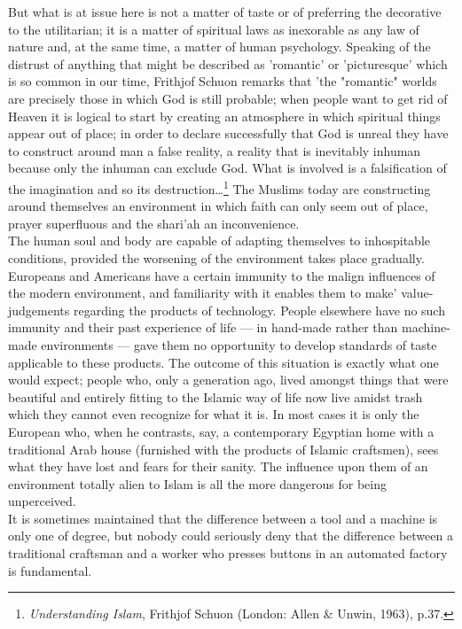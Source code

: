 \documentclass[11pt, b5paper, twoside]{book}
\begin{document}
But what is at issue here is not a matter of taste or of preferring the decorative to the 
utilitarian; it is a matter of spiritual laws as inexorable as any law of nature and, at the same 
time, a matter of human psychology. Speaking of the distrust of anything that might be described as 
'romantic' or 'picturesque' which is so common in our time, Frithjof Schuon remarks that 'the 
"romantic" worlds are precisely those in which God is still probable; when people want to get rid of 
Heaven it is logical to start by creating an atmosphere in which spiritual things appear out of 
place; in order to declare successfully that God is unreal they have to construct around man a false 
reality, a reality that is inevitably inhuman because only the inhuman can exclude God. What is 
involved is a falsification of the imagination and so its destruction\ldots\footnote{\emph{Understanding Islam}, Frithjof Schuon (London: Allen \& Unwin, 1963), p.37.} The Muslims today are 
constructing around themselves an environment in which faith can only seem out of place, prayer 
superfluous and the shari'ah an inconvenience. \\

The human soul and body are capable of adapting themselves to inhospitable conditions, provided the 
worsening of the environment takes place gradually. Europeans and Americans have a certain immunity 
to the malign influences of the modern environment, and familiarity with it enables them to make' 
value-judgements regarding the products of technology. People elsewhere have no such immunity and 
their past experience of life --- in hand-made rather than machine-made environments --- gave them no 
opportunity to develop standards of taste applicable to these products. The outcome of this situation 
is exactly what one would expect; people who, only a generation ago, lived amongst things that were 
beautiful and entirely fitting to the Islamic way of life now live amidst trash which they cannot 
even recognize for what it is. In most cases it is only the European who, when he contrasts, say, a 
contemporary Egyptian home with a traditional Arab house (furnished with the products of Islamic 
craftsmen), sees what they have lost and fears for their sanity. The influence upon them of an 
environment totally alien to Islam is all the more dangerous for being unperceived. \\

It is sometimes maintained that the difference between a tool and a machine is only one of degree, 
but nobody could seriously deny that the difference between a traditional craftsman and a worker who 
presses buttons in an automated factory is fundamental. \\
\end{document}
